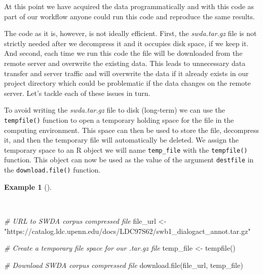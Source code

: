 \documentclass[
  letterpaper,
  DIV=11,
  numbers=noendperiod]{scrreprt}
\newenvironment{Shaded}{\begin{snugshade}}{\end{snugshade}}
\newcommand{\CommentTok}[1]{\textcolor[rgb]{0.00,0.00,0.00}{\textit{#1}}}
\newcommand{\FunctionTok}[1]{\textcolor[rgb]{0.00,0.00,0.00}{#1}}
\newcommand{\NormalTok}[1]{\textcolor[rgb]{0.00,0.00,0.00}{#1}}
\newcommand{\OtherTok}[1]{\textcolor[rgb]{0.00,0.00,0.00}{#1}}
\newcommand{\StringTok}[1]{\textcolor[rgb]{0.00,0.00,0.00}{#1}}
\theoremstyle{definition}
\newtheorem{example}{Example}[chapter]
\theoremstyle{remark}
\begin{document}
At this point we have acquired the data programmatically and with this
code as part of our workflow anyone could run this code and reproduce
the same results.

The code as it is, however, is not ideally efficient. First, the
\emph{swda.tar.gz} file is not strictly needed after we decompress it
and it occupies disk space, if we keep it. And second, each time we run
this code the file will be downloaded from the remote server and
overwrite the existing data. This leads to unnecessary data transfer and
server traffic and will overwrite the data if it already exists in our
project directory which could be problematic if the data changes on the
remote server. Let's tackle each of these issues in turn.

To avoid writing the \emph{swda.tar.gz} file to disk (long-term) we can
use the \texttt{tempfile()} function to open a temporary holding space
for the file in the computing environment. This space can then be used
to store the file, decompress it, and then the temporary file will
automatically be deleted. We assign the temporary space to an R object
we will name \texttt{temp\_file} with the \texttt{tempfile()} function.
This object can now be used as the value of the argument
\texttt{destfile} in the \texttt{download.file()} function.

\begin{example}[]\protect\hypertarget{exm-ad-swda-temp-file}{}\label{exm-ad-swda-temp-file}

~

\begin{Shaded}
\begin{Highlighting}[]
\CommentTok{\# URL to SWDA corpus compressed file}
\NormalTok{file\_url }\OtherTok{\textless{}{-}}
  \StringTok{"https://catalog.ldc.upenn.edu/docs/LDC97S62/swb1\_dialogact\_annot.tar.gz"}

\CommentTok{\# Create a temporary file space for our .tar.gz file}
\NormalTok{temp\_file }\OtherTok{\textless{}{-}} \FunctionTok{tempfile}\NormalTok{()}

\CommentTok{\# Download SWDA corpus compressed file}
\FunctionTok{download.file}\NormalTok{(file\_url, temp\_file)}
\end{Highlighting}
\end{Shaded}

\end{example}
\end{document}
